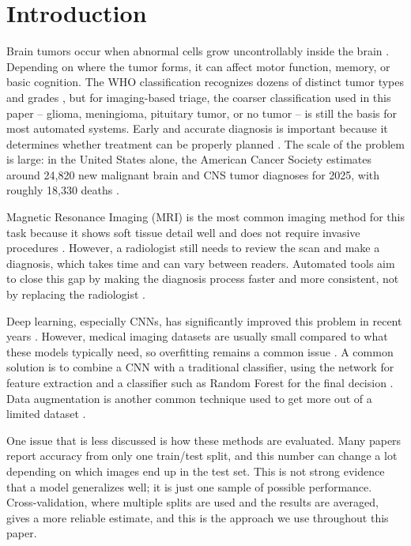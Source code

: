 \documentclass[conference]{IEEEtran}
\begin{document}
\section{Introduction}
Brain tumors occur when abnormal cells grow uncontrollably inside the brain \cite{r16}. Depending on where the tumor forms, it can affect motor function, memory, or basic cognition. The WHO classification recognizes dozens of distinct tumor types and grades \cite{louis2021who}, but for imaging-based triage, the coarser classification used in this paper -- glioma, meningioma, pituitary tumor, or no tumor -- is still the basis for most automated systems. Early and accurate diagnosis is important because it determines whether treatment can be properly planned \cite{r16}. The scale of the problem is large: in the United States alone, the American Cancer Society estimates around 24,820 new malignant brain and CNS tumor diagnoses for 2025, with roughly 18,330 deaths \cite{r4}.

Magnetic Resonance Imaging (MRI) is the most common imaging method for this task because it shows soft tissue detail well and does not require invasive procedures \cite{r16}. However, a radiologist still needs to review the scan and make a diagnosis, which takes time and can vary between readers. Automated tools aim to close this gap by making the diagnosis process faster and more consistent, not by replacing the radiologist \cite{r19}.

Deep learning, especially CNNs, has significantly improved this problem in recent years \cite{r16, r17}. However, medical imaging datasets are usually small compared to what these models typically need, so overfitting remains a common issue \cite{r19}. A common solution is to combine a CNN with a traditional classifier, using the network for feature extraction and a classifier such as Random Forest for the final decision \cite{r18, r20}. Data augmentation is another common technique used to get more out of a limited dataset \cite{r20}.

One issue that is less discussed is how these methods are evaluated. Many papers report accuracy from only one train/test split, and this number can change a lot depending on which images end up in the test set. This is not strong evidence that a model generalizes well; it is just one sample of possible performance. Cross-validation, where multiple splits are used and the results are averaged, gives a more reliable estimate, and this is the approach we use throughout this paper.
\end{document}
